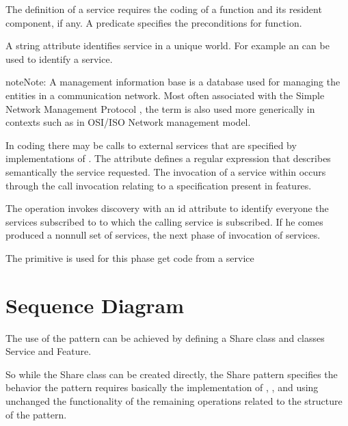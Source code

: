 \documentclass[a4paper,10pt,english,openany,oneside]{sphinxmanual}
\begin{document}
The definition of a service requires the coding of a function
 and its  resident component, if any. A  predicate specifies the
preconditions for function.

A string attribute identifies service in a unique world. For example an  can be
used to identify a service.

\begin{sphinxadmonition}{note}{Note:}
A management information base  is a database used for managing the
entities in a communication network. Most often associated with the
Simple Network Management Protocol , the term is also used more
generically in contexts such as in OSI/ISO Network management model.
\end{sphinxadmonition}

In  coding there may be calls to external services that are specified by implementations of
. The  attribute defines a regular expression that describes semantically the service requested. The invocation of a service within 
occurs through the call invocation relating to a specification present in features.

The  operation invokes discovery with an id attribute to identify everyone
the services subscribed to  to which the calling service is subscribed. If he comes
produced a non\sphinxhyphen{}null set of services, the next phase of invocation of services.

The primitive  is used for this phase get code from a service


\section{Sequence Diagram}
\label{\detokenize{pattern:sequence-diagram}}
\noindent{}

The use of the pattern can be achieved by defining a  Share class and  classes Service and Feature.

So while the Share class can be created directly, the Share pattern specifies the behavior the pattern requires
basically the implementation of , ,  and  using unchanged the functionality of the
remaining operations related to the structure of the pattern.
\end{document}
